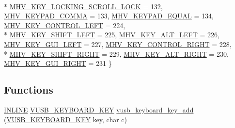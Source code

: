 \begin{DoxyCompactItemize}
\\*
\hyperlink{namespacemhvlib__gpl_aedc418598d33ab788795edf3a68244adac4a4c8d7487feee401dea6aeccc1aed4}{M\-H\-V\-\_\-\-K\-E\-Y\-\_\-\-L\-O\-C\-K\-I\-N\-G\-\_\-\-S\-C\-R\-O\-L\-L\-\_\-\-L\-O\-C\-K} =  132, 
\hyperlink{namespacemhvlib__gpl_aedc418598d33ab788795edf3a68244adaef150a7f908229e42523e00e02afdb7a}{M\-H\-V\-\_\-\-K\-E\-Y\-P\-A\-D\-\_\-\-C\-O\-M\-M\-A} =  133, 
\hyperlink{namespacemhvlib__gpl_aedc418598d33ab788795edf3a68244ada50358c626b183c626aaf70339dc3ed1a}{M\-H\-V\-\_\-\-K\-E\-Y\-P\-A\-D\-\_\-\-E\-Q\-U\-A\-L} =  134, 
\hyperlink{namespacemhvlib__gpl_aedc418598d33ab788795edf3a68244ada8a16cfc6c4154f94aaad4e52d3beef77}{M\-H\-V\-\_\-\-K\-E\-Y\-\_\-\-C\-O\-N\-T\-R\-O\-L\-\_\-\-L\-E\-F\-T} =  224, 
\\*
\hyperlink{namespacemhvlib__gpl_aedc418598d33ab788795edf3a68244ada31e8c5fc2b0a0665fd25beb51a0a12fb}{M\-H\-V\-\_\-\-K\-E\-Y\-\_\-\-S\-H\-I\-F\-T\-\_\-\-L\-E\-F\-T} =  225, 
\hyperlink{namespacemhvlib__gpl_aedc418598d33ab788795edf3a68244adac11bdc94b87ca3965021fd7a1aa396d6}{M\-H\-V\-\_\-\-K\-E\-Y\-\_\-\-A\-L\-T\-\_\-\-L\-E\-F\-T} =  226, 
\hyperlink{namespacemhvlib__gpl_aedc418598d33ab788795edf3a68244adaedaf23fa5409327754b697715de5441f}{M\-H\-V\-\_\-\-K\-E\-Y\-\_\-\-G\-U\-I\-\_\-\-L\-E\-F\-T} =  227, 
\hyperlink{namespacemhvlib__gpl_aedc418598d33ab788795edf3a68244ada2b67c86676a1af8e62c7bf22c67949af}{M\-H\-V\-\_\-\-K\-E\-Y\-\_\-\-C\-O\-N\-T\-R\-O\-L\-\_\-\-R\-I\-G\-H\-T} =  228, 
\\*
\hyperlink{namespacemhvlib__gpl_aedc418598d33ab788795edf3a68244ada9c7b4ae0a616af26bd8bd24bff98eb26}{M\-H\-V\-\_\-\-K\-E\-Y\-\_\-\-S\-H\-I\-F\-T\-\_\-\-R\-I\-G\-H\-T} =  229, 
\hyperlink{namespacemhvlib__gpl_aedc418598d33ab788795edf3a68244ada05913a4db50f783c6aa495a9d7b4ca81}{M\-H\-V\-\_\-\-K\-E\-Y\-\_\-\-A\-L\-T\-\_\-\-R\-I\-G\-H\-T} =  230, 
\hyperlink{namespacemhvlib__gpl_aedc418598d33ab788795edf3a68244ada93a5ebd6a4c20b581b27a71007465b01}{M\-H\-V\-\_\-\-K\-E\-Y\-\_\-\-G\-U\-I\-\_\-\-R\-I\-G\-H\-T} =  231
 \}
\end{DoxyCompactItemize}
\subsection*{Functions}
\begin{DoxyCompactItemize}
\item 
\hyperlink{io_8h_a2eb6f9e0395b47b8d5e3eeae4fe0c116}{I\-N\-L\-I\-N\-E} \hyperlink{namespacemhvlib__gpl_aa9b4ef45d3803d8e5cd3ab8c7441e74f}{V\-U\-S\-B\-\_\-\-K\-E\-Y\-B\-O\-A\-R\-D\-\_\-\-K\-E\-Y} \hyperlink{namespacemhvlib__gpl_adf914e68378d0d1a89d44cebf381f020}{vusb\-\_\-keyboard\-\_\-key\-\_\-add} (\hyperlink{namespacemhvlib__gpl_aa9b4ef45d3803d8e5cd3ab8c7441e74f}{V\-U\-S\-B\-\_\-\-K\-E\-Y\-B\-O\-A\-R\-D\-\_\-\-K\-E\-Y} key, char c)
\end{DoxyCompactItemize}


